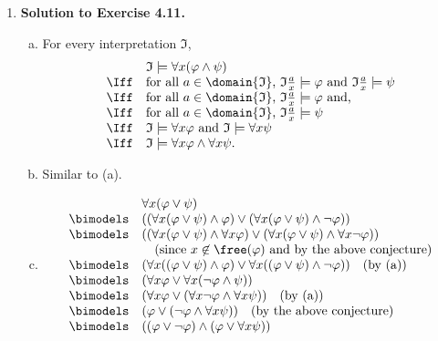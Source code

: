 \begin{enumerate}[1.]
%
\item \textbf{Solution to Exercise 4.11.}
\begin{enumerate}[(a)]
\item \label{item_a} For every interpretation $\mathfrak{I}$,
\[
\begin{array}{ll}
\,  & \mathfrak{I} \models \forall x ( \varphi \land \psi ) \\
\Iff & \mbox{for all $a \in \domain{\mathfrak{I}}$, $\mathfrak{I} \frac{a}{x} \models \varphi \mbox{ and } \mathfrak{I} \frac{a}{x} \models \psi$} \\
\Iff & \mbox{for all $a \in \domain{\mathfrak{I}}$, $\mathfrak{I} \frac{a}{x} \models \varphi$ and,} \\
\Iff & \mbox{for all $a \in \domain{\mathfrak{I}}$, $\mathfrak{I} \frac{a}{x} \models \psi$} \\
\Iff & \mathfrak{I} \models \forall x \varphi \mbox{ and } \mathfrak{I} \models \forall x \psi \\
\Iff & \mathfrak{I} \models \forall x \varphi \land \forall x \psi.
\end{array}
\]
\item Similar to (a).
\item
\[
\begin{array}{ll}
\         & \forall x (\varphi \lor \psi) \\
\bimodels & ((\forall x (\varphi \lor \psi) \land \varphi) \lor (\forall x (\varphi \lor \psi) \land \neg \varphi)) \\
\bimodels & ((\forall x (\varphi \lor \psi) \land \forall x \varphi) \lor (\forall x (\varphi \lor \psi) \land \forall x \neg \varphi)) \\
\         & \mbox{\ \ \ (since $x \not \in \free(\varphi)$ and by the above conjecture)} \\
\bimodels & (\forall x ((\varphi \lor \psi) \land \varphi) \lor \forall x ((\varphi \lor \psi) \land \neg \varphi)) \mbox{\ \ \ (by (a))} \\
\bimodels & (\forall x \varphi \lor \forall x (\neg \varphi \land \psi)) \\
\bimodels & (\forall x \varphi \lor (\forall x \neg \varphi \land \forall x \psi)) \mbox{\ \ \ (by (a))} \\
\bimodels & (\varphi \lor (\neg \varphi \land \forall x \psi)) \mbox{\ \ \ (by the above conjecture)}\\
\bimodels & ((\varphi \lor \neg \varphi) \land (\varphi \lor \forall x \psi)) \\

\end{array}\]
\end{enumerate}
\end{enumerate}
